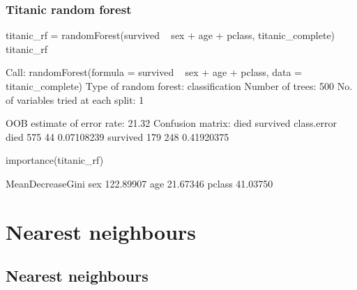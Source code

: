 \documentclass[a4paper]{article}
\begin{document}
\subsubsection{Titanic random forest}
\begin{Schunk}
\begin{Sinput}
titanic_rf = randomForest(survived ~ sex + age + pclass, titanic_complete)
titanic_rf
\end{Sinput}
\begin{Soutput}

Call:
 randomForest(formula = survived ~ sex + age + pclass, data = titanic_complete) 
               Type of random forest: classification
                     Number of trees: 500
No. of variables tried at each split: 1

        OOB estimate of  error rate: 21.32%
Confusion matrix:
         died survived class.error
died      575       44  0.07108239
survived  179      248  0.41920375
\end{Soutput}
\begin{Sinput}
importance(titanic_rf)
\end{Sinput}
\begin{Soutput}
       MeanDecreaseGini
sex           122.89907
age            21.67346
pclass         41.03750
\end{Soutput}
\end{Schunk}
\newpage

\section{Nearest neighbours}\label{sec:33}
\subsection{Nearest neighbours}
\end{document}
